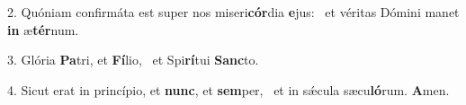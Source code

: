 2. Quóniam confirmáta est super nos miseri\textbf{cór}dia \textbf{e}jus: \ast\  et véritas Dómini manet \textbf{in} æ\textbf{tér}num.\

3. Glória \textbf{Pa}tri, et \textbf{Fí}lio, \ast\  et Spi\textbf{rí}tui \textbf{Sanc}to.\

4. Sicut erat in princípio, et \textbf{nunc}, et \textbf{sem}per, \ast\  et in sǽcula sæcu\textbf{ló}rum. \textbf{A}men.\

